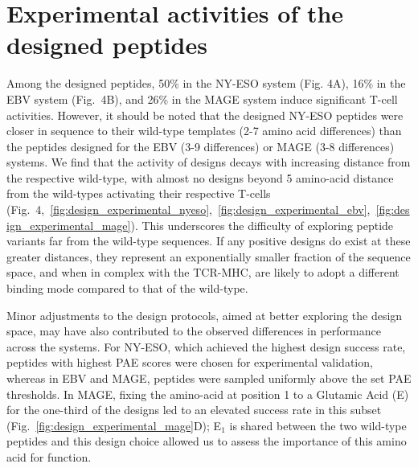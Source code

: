 \section{Experimental activities of the designed peptides}
\label{sec:exp_analysis}

 Among the designed
peptides, 50\% in the NY-ESO system (Fig. 4A), 16\% in the EBV system (Fig.~4B), and 26\% in the
MAGE system induce significant T-cell activities. However, it should be noted that the designed
NY-ESO peptides were closer in sequence to their wild-type templates (2-7 amino acid differences)
than the peptides designed for the EBV (3-9 differences) or MAGE (3-8 differences) systems. We find
that the activity of designs decays with increasing distance from the respective wild-type, with
almost no designs beyond 5 amino-acid distance from the wild-types activating their respective
T-cells
(Fig.~4,~\ref{fig:design_experimental_nyeso},~\ref{fig:design_experimental_ebv},~\ref{fig:design_experimental_mage}).
This underscores the difficulty of exploring peptide variants far from the wild-type sequences. If
any positive designs do exist at these greater distances, they represent an exponentially smaller
fraction of the sequence space, and when in complex with the TCR-MHC, are likely to adopt a
different binding mode compared to that of the wild-type.

Minor adjustments to the design protocols, aimed at better exploring the design space, may have also
contributed to the observed differences in performance across the systems. For NY-ESO, which
achieved the highest design success rate, peptides with highest PAE scores were chosen for
experimental validation, whereas in EBV and MAGE, peptides were sampled uniformly above the set PAE
thresholds. In MAGE, fixing the amino-acid at position 1 to a Glutamic Acid (E) for the one-third of
the designs led to an elevated success rate in this subset
(Fig.~\ref{fig:design_experimental_mage}D); E$_1$ is shared between the two wild-type peptides and
this design choice allowed us to assess the importance of this amino acid for function. \\

